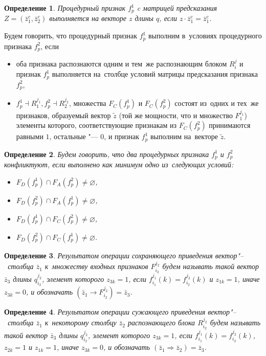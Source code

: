 \documentclass[a4paper, 12pt]{article}
\theoremstyle{plain}
\newtheorem{Def}{Определение}
\begin{document}
		\begin{Def}
			Процедурный признак $f_p^1$ c матрицей предсказания $Z=(\bar z_1^c,\bar z_2^e)$ выполняется на векторе $z$ длины $q$, если $z\cdot \bar z_1^c=\bar z_1^c$.
		\end{Def}
		Будем говорить, что процедурный признак $f_p^1$ выполним в~условиях процедурного признака $f_p^2$, если 
		\begin{itemize}
			\item оба признака распознаются одним и тем~же распознающим блоком $R_i^j$ и признак  $f_p^1$ выполняется на~столбце условий матрицы предсказания признака $f_p^2$,
			\item $f_p^1\dashv R_1^{j_1}, f_p^2\dashv R_2^{j_2}$, множества $F_C(f_p^1 )$ и $F_C(f_p^2)$ состоят из~одних и тех~же признаков, образуемый вектор $\tilde z$ (той же мощности, что и множество $F_1^{j_1}$) элементы которого, соответствующие признакам из $F_C(f_p^2)$ принимаются равными $1$,  остальные "--- $0$, и признак $f_p^1$ выполним на~векторе $\tilde z$. 
		\end{itemize}
		
		\begin{Def}
			Будем говорить, что два процедурных признака $f_p^1$ и $f_p^2$ конфликтуют, если выполнено как минимум одно из~следующих условий:
			\begin{itemize}
				\item $F_D(f_p^1)\cap F_A(f_p^2)\not=\varnothing$,
				\item $F_D(f_p^2)\cap F_A(f_p^1)\not=\varnothing$,
				\item $F_D(f_p^1)\cap F_C(f_p^2)\not=\varnothing$,
				\item $F_D(f_p^2)\cap F_C(f_p^1)\not=\varnothing$.
			\end{itemize}
		\end{Def}
		
		\begin{Def}
			Результатом операции сохраняющего приведения вектор"--~столбца $\bar z_1$ к~множеству входных признаков $F_{i_2}^{j_2}$ будем называть такой вектор $\bar z_3$ длины $q_{i_2}^{j_2}$, элемент которого $z_{3k}=1$, если $f_{i_1}^{j_1}(k)=f_{i_2}^{j_2}(k)$ и $z_{1k}=1$, иначе $z_{3k}=0$, и обозначать $(\bar z_1\rightarrow F_{i_2}^{j_2})=\bar z_3$.
		\end{Def}
		
		\begin{Def}
			Результатом операции сужающего приведения вектор"--~столбца $\bar z_1$ к~некоторому столбцу $\bar z_2$ распознающего блока $R_{i_2}^{j_2}$ будем называть такой вектор $\bar z_3$ длины $q_{i_2}^{j_2}$, элемент которого $z_{3k}=1$, если $f_{i_1}^{j_1}(k)=f_{i_2}^{j_2}(k)$, $z_{2k}=1$ и $z_{1k}=1$, иначе $z_{3k}=0$, и обозначать $(\bar z_1\Rightarrow \bar z_2)=\bar z_3$.
		\end{Def}
		
\end{document}

